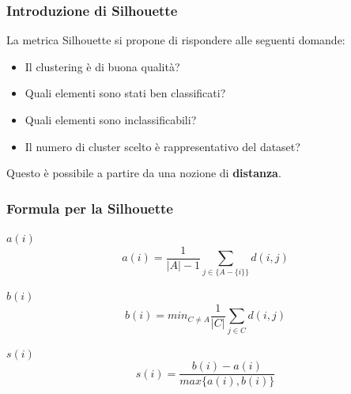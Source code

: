 \documentclass{beamer}
\begin{document}
        \begin{frame}
            \frametitle{Introduzione di Silhouette}

            La metrica Silhouette si propone di rispondere alle seguenti domande:
        
            \begin{itemize}
                \item
                Il clustering è di buona qualità?
                \item
                Quali elementi sono stati ben classificati?
                \item
                Quali elementi sono inclassificabili?
                \item
                Il numero di cluster scelto è rappresentativo del dataset?
            \end{itemize}

            \vfill
            Questo è possibile a partire da una nozione di \textbf{distanza}.
        \end{frame}

        \begin{frame}
            \frametitle{Formula per la Silhouette}

            \centering
            \begin{boxedminipage}{0.49\textwidth}
                \begin{block}{$a(i)$}
                    \begin{equation*}
                        a(i) = \frac{1}{|A| - 1} \sum_{j \in \{A - \{i\}\}} d(i, j)
                    \end{equation*}
                \end{block}
            \end{boxedminipage}
            \begin{boxedminipage}{0.49\textwidth}
                \begin{block}{$b(i)$}
                    \begin{equation*}
                        b(i) = min_{C \neq A} \frac{1}{|C|} \sum_{j \in C} d(i, j)
                    \end{equation*}
                \end{block}
            \end{boxedminipage}

            \vfill

            \begin{block}{$s(i)$}
                \begin{equation*}
                    s(i) = \frac{b(i) - a(i)}{max\{a(i), b(i)\}}
                \end{equation*}
            \end{block}
        \end{frame}
\end{document}
